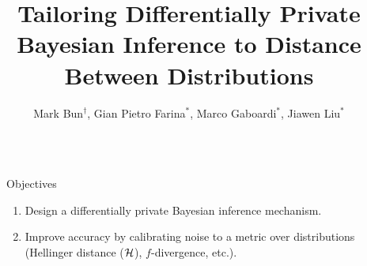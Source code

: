 \documentclass[final,hyperref={pdfpagelabels=false}]{beamer}
\title{\LARGE Tailoring Differentially Private Bayesian Inference to Distance Between Distributions} %
\author{Mark Bun$^\dag$,
Gian Pietro Farina$^{*}$,
Marco Gaboardi$^{*}$,
Jiawen Liu$^{*}$
}
\institute{$^\dag$Princeton University, $^{*}$University at Buffalo, SUNY} %
\begin{document}
\begin{frame}[t] %

\begin{columns}[t] %

\begin{column}{.015\textwidth}\end{column} %

\begin{column}{.485\textwidth} %


\begin{block}{Objectives}
\begin{enumerate}
\item Design a differentially private Bayesian inference mechanism.
\item Improve accuracy by calibrating noise to a metric over distributions (Hellinger distance ($\mathcal{H}$), $f$-divergence, etc.).
\end{enumerate}


\end{block}
\end{column}
\end{columns}
\end{frame}
\end{document}
